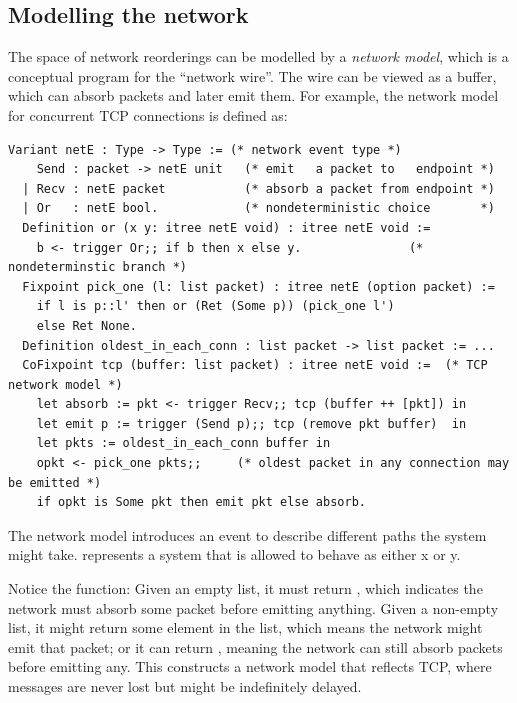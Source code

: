 \subsection{Modelling the network}
\label{sec:net-tcp}
The space of network reorderings can be modelled by a {\em network model}, which
is a conceptual program for the ``network wire''.  The wire can be viewed as a
buffer, which can absorb packets and later emit them.  For example, the network
model for concurrent TCP connections is defined as:
\begin{lstlisting}[style=customcoq]
  Variant netE : Type -> Type := (* network event type *)
    Send : packet -> netE unit   (* emit   a packet to   endpoint *)
  | Recv : netE packet           (* absorb a packet from endpoint *)
  | Or   : netE bool.            (* nondeterministic choice       *)
  Definition or (x y: itree netE void) : itree netE void :=
    b <- trigger Or;; if b then x else y.               (* nondeterminstic branch *)
  Fixpoint pick_one (l: list packet) : itree netE (option packet) :=
    if l is p::l' then or (Ret (Some p)) (pick_one l')
    else Ret None.
  Definition oldest_in_each_conn : list packet -> list packet := ...
  CoFixpoint tcp (buffer: list packet) : itree netE void :=  (* TCP network model *)
    let absorb := pkt <- trigger Recv;; tcp (buffer ++ [pkt]) in
    let emit p := trigger (Send p);; tcp (remove pkt buffer)  in
    let pkts := oldest_in_each_conn buffer in
    opkt <- pick_one pkts;;     (* oldest packet in any connection may be emitted *)
    if opkt is Some pkt then emit pkt else absorb.
\end{lstlisting}
The network model introduces an  event to describe different paths the
system might take.   represents a system that is allowed to behave
as either \ilc x or \ilc y.

Notice the  function: Given an empty list, it must return
, which indicates the network must absorb some packet before emitting
anything.  Given a non-empty list, it might return some element in the list,
which means the network might emit that packet; or it can return ,
meaning the network can still absorb packets before emitting any.  This
constructs a network model that reflects TCP, where messages are never lost but
might be indefinitely delayed.

